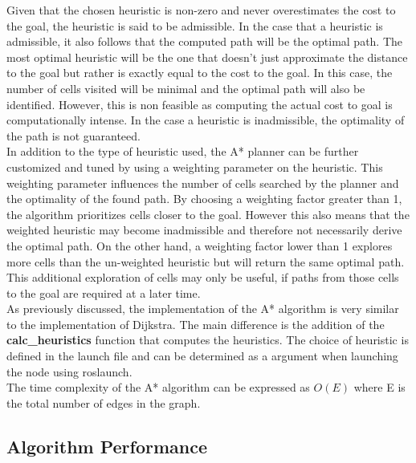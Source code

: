 \documentclass[a4paper,12pt]{article}
\begin{document}
				Given that the chosen heuristic is non-zero and never overestimates the cost to the goal, the heuristic is said to be admissible. In the case that a heuristic is admissible, it also follows that the computed path will be the optimal path. The most optimal heuristic will be the one that doesn't just approximate the distance to the goal but rather is exactly equal to the cost to the goal. In this case, the number of cells visited will be minimal and the optimal path will also be identified. However, this is non feasible as computing the actual cost to goal is computationally intense. In the case a heuristic is inadmissible, the optimality of the path is not guaranteed.
				\\
				In addition to the type of heuristic used, the A* planner can be further customized and tuned by using a weighting parameter on the heuristic. This weighting parameter influences the number of cells searched by the planner and the optimality of the found path. By choosing a weighting factor greater than 1, the algorithm prioritizes cells closer to the goal. However this also means that the weighted heuristic may become inadmissible and therefore not necessarily derive the optimal path. On the other hand, a weighting factor lower than 1 explores more cells than the un-weighted heuristic but will return the same optimal path. This additional exploration of cells may only be useful, if paths from those cells to the goal are required at a later time. 
				\\
				As previously discussed, the implementation of the A* algorithm is very similar to the implementation of Dijkstra. The main difference is the addition of the \textbf{calc\_heuristics} function that computes the heuristics. The choice of heuristic is defined in the launch file and can be determined as a argument when launching the node using roslaunch.
				\\
				The time complexity of the A* algorithm can be expressed as $O(E)$ where E is the total number of edges in the graph.
				
		\subsection{Algorithm Performance}
\end{document}
